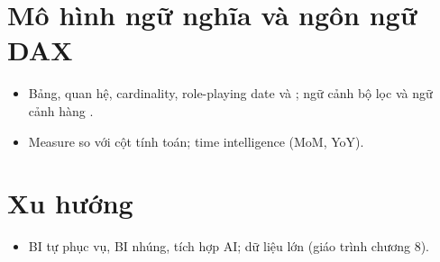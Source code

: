 \section{Mô hình ngữ nghĩa và ngôn ngữ DAX}
\begin{itemize}
  \item Bảng, quan hệ, cardinality, role-playing date và ; ngữ cảnh bộ lọc và ngữ cảnh hàng \cite{dax_docs}.
  \item Measure so với cột tính toán; time intelligence (MoM, YoY).
\end{itemize}

\section{Xu hướng}
\begin{itemize}
  \item BI tự phục vụ, BI nhúng, tích hợp AI; dữ liệu lớn (giáo trình chương 8).
\end{itemize}

